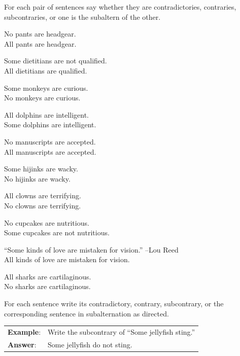 \noindent \problempart For each pair of sentences say whether they are contradictories, contraries, subcontraries, or one is the subaltern of the other.

\begin{exercises}
\item No pants are headgear. \\
	All pants are headgear.
\item Some dietitians are not qualified. \\
	All dietitians are qualified.
\item Some monkeys are curious. \\
	No monkeys are curious.
\item All dolphins are intelligent. \\
	Some dolphins are intelligent.
\item No manuscripts are accepted. \\
	All manuscripts are accepted.
\item Some hijinks are wacky. \\
	No hijinks are wacky.
\item All clowns are terrifying. \\
	No clowns are terrifying.
\item No cupcakes are nutritious. \\
	Some cupcakes are not nutritious.
\item ``Some kinds of love are mistaken for vision.'' --Lou Reed \\
	All kinds of love are mistaken for vision.
\item All sharks are cartilaginous. \\
	No sharks are cartilaginous.
\end{exercises}

\noindent \problempart For each sentence write its contradictory, contrary, subcontrary, or the corresponding sentence in subalternation as directed.

\begin{longtabu}{p{.1\linewidth}p{.9\linewidth}}
\textbf{Example}: & Write the subcontrary of ``Some jellyfish sting.''\\
\textbf{Answer}: & Some jellyfish do not sting.\\
\end{longtabu}


